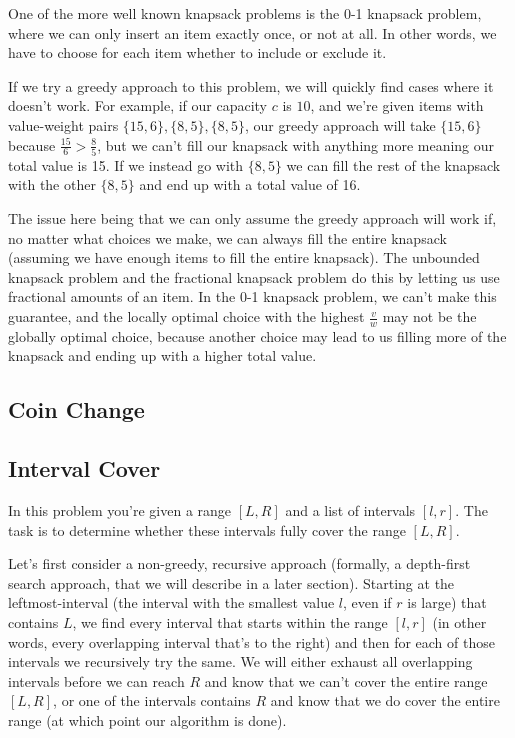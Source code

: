 \hrulefill

One of the more well known knapsack problems is the 0-1 knapsack problem, where we can only insert an item exactly once, or not at all. In other words, we have to choose for each item whether to include or exclude it.

If we try a greedy approach to this problem, we will quickly find cases where it doesn't work. For example, if our capacity $c$ is $10$, and we're given items with value-weight pairs $\{15,6\},\{8,5\},\{8,5\}$, our greedy approach will take $\{15,6\}$ because $\frac{15}{6} > \frac{8}{5}$, but we can't fill our knapsack with anything more meaning our total value is 15. If we instead go with $\{8,5\}$ we can fill the rest of the knapsack with the other $\{8,5\}$ and end up with a total value of 16.

The issue here being that we can only assume the greedy approach will work if, no matter what choices we make, we can always fill the entire knapsack (assuming we have enough items to fill the entire knapsack). The unbounded knapsack problem and the fractional knapsack problem do this by letting us use fractional amounts of an item. In the 0-1 knapsack problem, we can't make this guarantee, and the locally optimal choice with the highest $\frac{v}{w}$ may not be the globally optimal choice, because another choice may lead to us filling more of the knapsack and ending up with a higher total value.

\subsection{Coin Change}

\subsection{Interval Cover}

In this problem you're given a range $[L,R]$ and a list of intervals $[l,r]$. The task is to determine whether these intervals fully cover the range $[L,R]$.

Let's first consider a non-greedy, recursive approach (formally, a depth-first search approach, that we will describe in a later section). Starting at the leftmost-interval (the interval with the smallest value $l$, even if $r$ is large) that contains $L$, we find every interval that starts within the range $[l,r]$ (in other words, every overlapping interval that's to the right) and then for each of those intervals we recursively try the same. We will either exhaust all overlapping intervals before we can reach $R$ and know that we can't cover the entire range $[L,R]$, or one of the intervals contains $R$ and know that we do cover the entire range (at which point our algorithm is done).


